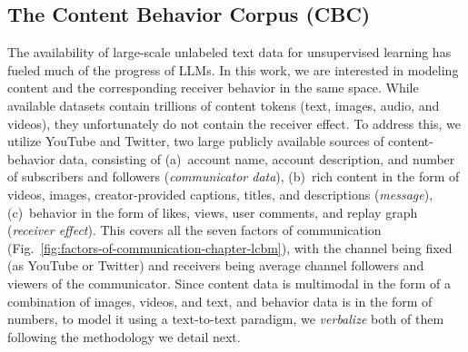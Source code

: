 \subsection{The Content Behavior Corpus (CBC)}
\label{sec:content behavior corpus}
The availability of large-scale unlabeled text data for unsupervised learning has fueled much of the progress of LLMs. In this work, we are interested in modeling content and the corresponding receiver behavior in the same space. While available datasets contain trillions of content tokens (text, images, audio, and videos), they unfortunately do not contain the receiver effect. To address this, we utilize YouTube and Twitter, two large publicly available sources of content-behavior data, consisting of (a)~account name, account description, and number of subscribers and followers (\textit{communicator data}), (b)~rich content in the form of videos, images, creator-provided captions, titles, and descriptions (\textit{message}), (c)~behavior in the form of likes, views, user comments, and replay graph (\textit{receiver effect}). This covers all the seven factors of communication (Fig.~\ref{fig:factors-of-communication-chapter-lcbm}), with the channel being fixed (as YouTube or Twitter) and receivers being average channel followers and viewers of the communicator. Since content data is multimodal in the form of a combination of images, videos, and text, and behavior data is in the form of numbers, to model it using a text-to-text paradigm, we \textit{verbalize} both of them following the methodology we detail next.


